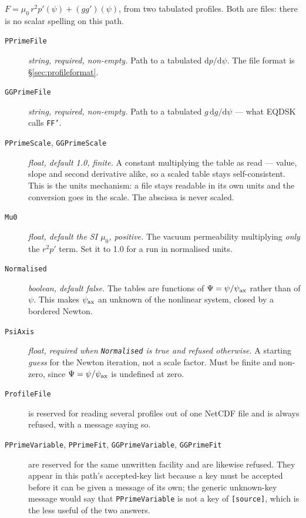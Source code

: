$F = \mu_{0}\,r^{2}p'(\psi) + (gg')(\psi)$, from two tabulated profiles. Both
are files: there is no scalar spelling on this path.

\begin{description}

\item[\texttt{PPrimeFile}] \emph{string, required, non-empty.} Path to a
	tabulated $\mathrm{d}p/\mathrm{d}\psi$. The file format is
	\S\ref{sec:profileformat}.

\item[\texttt{GGPrimeFile}] \emph{string, required, non-empty.} Path to a
	tabulated $g\,\mathrm{d}g/\mathrm{d}\psi$ --- what EQDSK calls
	\texttt{FF'}.

\item[\texttt{PPrimeScale}, \texttt{GGPrimeScale}] \emph{float, default 1.0,
	finite.} A constant multiplying the table as read --- value, slope and
	second derivative alike, so a scaled table stays self-consistent. This is
	the units mechanism: a file stays readable in its own units and the
	conversion goes in the scale. The abscissa is never scaled.

\item[\texttt{Mu0}] \emph{float, default the SI $\mu_0$, positive.} The vacuum
	permeability multiplying \emph{only} the $r^{2}p'$ term. Set it to 1.0 for a
	run in normalised units.

\item[\texttt{Normalised}] \emph{boolean, default false.} The tables are
	functions of $\Psi = \psi/\psi_{\mathrm{ax}}$ rather than of $\psi$. This makes $\psi_{\mathrm{ax}}$
	an unknown of the nonlinear system, closed by a bordered Newton.

\item[\texttt{PsiAxis}] \emph{float, required when \texttt{Normalised} is true
	and refused otherwise.} A starting \emph{guess} for the Newton iteration,
	not a scale factor. Must be finite and non-zero, since $\Psi = \psi/\psi_{\mathrm{ax}}$
	is undefined at zero.

\item[\texttt{ProfileFile}] is reserved for reading several profiles out of one
	NetCDF file and is always refused, with a message saying so.

\item[\texttt{PPrimeVariable}, \texttt{PPrimeFit}, \texttt{GGPrimeVariable},
	\texttt{GGPrimeFit}] are reserved for the same unwritten facility and are
	likewise refused. They appear in this path's accepted-key list because a key
	must be accepted before it can be given a message of its own; the generic
	unknown-key message would say that \texttt{PPrimeVariable} is not a key of
	\texttt{[source]}, which is the less useful of the two answers.

\end{description}


